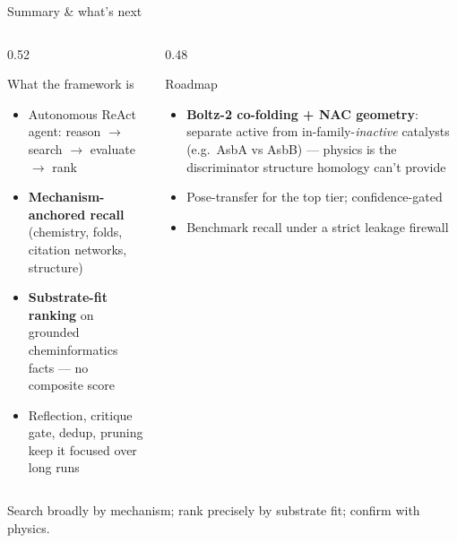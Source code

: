 \documentclass[aspectratio=169, 11pt]{beamer}
\begin{document}
\begin{frame}{Summary \& what's next}
  \begin{columns}[T]
    \begin{column}{0.52\textwidth}
      \begin{block}{What the framework is}
        \footnotesize
        \begin{itemize}\setlength\itemsep{2pt}
          \item Autonomous ReAct agent: reason $\rightarrow$ search $\rightarrow$ evaluate $\rightarrow$ rank
          \item \textbf{Mechanism-anchored recall} (chemistry, folds, citation networks, structure)
          \item \textbf{Substrate-fit ranking} on grounded cheminformatics facts --- no composite score
          \item Reflection, critique gate, dedup, pruning keep it focused over long runs
        \end{itemize}
      \end{block}
    \end{column}
    \begin{column}{0.48\textwidth}
      \begin{alertblock}{Roadmap}
        \footnotesize
        \begin{itemize}\setlength\itemsep{2pt}
          \item \textbf{Boltz-2 co-folding + NAC geometry}: separate active from
                in-family-\emph{inactive} catalysts (e.g.\ AsbA vs AsbB) ---
                physics is the discriminator structure homology can't provide
          \item Pose-transfer for the top tier; confidence-gated
          \item Benchmark recall under a strict leakage firewall
        \end{itemize}
      \end{alertblock}
    \end{column}
  \end{columns}
  \vfill
  \begin{center}\small\color{deepblue}
  Search broadly by mechanism; rank precisely by substrate fit; confirm with physics.
  \end{center}
\end{frame}
\end{document}
